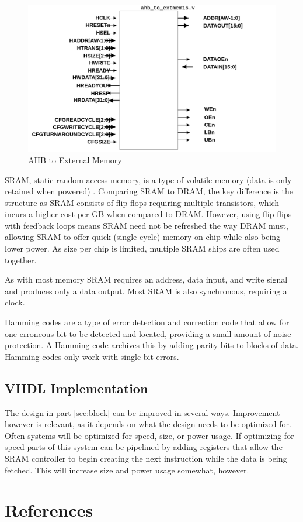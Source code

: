 \documentclass[11pt]{article}
\begin{document}
\begin{figure}[H]        
    \centering
    \includegraphics[width=.5\textwidth]{ahb_ext.png}
    \caption{AHB to External Memory\cite{sram_arm}}
    \label{fig:ahb_ext}
\end{figure} 

SRAM, static random access memory, is a type of volatile memory (data is only retained when powered) \cite{dally}. 
Comparing SRAM to DRAM, the key difference is the structure as SRAM consists of flip-flops requiring multiple transistors, which incurs a higher cost per GB when compared to DRAM.
However, using flip-flips with feedback loops means SRAM need not be refreshed the way DRAM must, allowing SRAM to offer quick (single cycle) memory on-chip while also being lower power.
As size per chip is limited, multiple SRAM ships are often used together.

As with most memory SRAM requires an address, data input, and write signal and produces only a data output. Most SRAM is also synchronous, requiring a clock.

Hamming codes are a type of error detection and correction code that allow for one erroneous bit to be detected and located, providing a small amount of noise protection.
A Hamming code archives this by adding parity bits to blocks of data.
Hamming codes only work with single-bit errors. \cite{hamming} \cite{ham}



\subsection{VHDL Implementation}

The design in part \ref{sec:block} can be improved in several ways.
Improvement however is relevant, as it depends on what the design needs to be optimized for.
Often systems will be optimized for speed, size, or power usage.
If optimizing for speed parts of this system can be pipelined by adding registers that allow the SRAM controller to begin creating the next instruction while the data is being fetched.
This will increase size and power usage somewhat, however. 

\pagebreak
\appendix
\renewcommand{\thesection}{\Roman{section}}
\section{References}
\printbibliography[heading=none]
\end{document}

